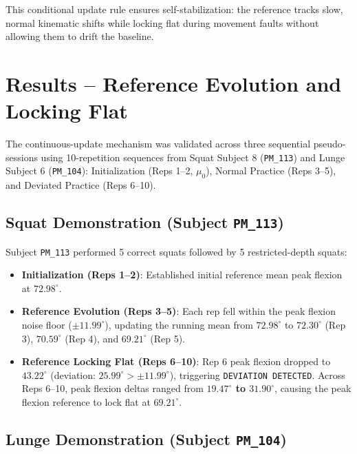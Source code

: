 This conditional update rule ensures self-stabilization: the reference tracks slow, normal kinematic shifts while locking flat during movement faults without allowing them to drift the baseline.



\section{Results -- Reference Evolution and Locking Flat}
\label{sec:11-3-results-reference-evolution-and-locking-flat}


The continuous-update mechanism was validated across three sequential pseudo-sessions using 10-repetition sequences from Squat Subject 8 (\texttt{PM\_113}) and Lunge Subject 6 (\texttt{PM\_104}): Initialization (Reps 1–2, $\mu_0$), Normal Practice (Reps 3–5), and Deviated Practice (Reps 6–10).

\subsection{Squat Demonstration (Subject \texttt{PM\_113})}
\label{sec:11-3-1-squat-demonstration-subject-texttt-pm-113}

Subject \texttt{PM\_113} performed 5 correct squats followed by 5 restricted-depth squats:
\begin{itemize}
  \item \textbf{Initialization (Reps 1–2)}: Established initial reference mean peak flexion at \textbf{$72.98^\circ$}.
  \item \textbf{Reference Evolution (Reps 3–5)}: Each rep fell within the peak flexion noise floor ($\pm 11.99^\circ$), updating the running mean from $72.98^\circ$ to \textbf{$72.30^\circ$} (Rep 3), \textbf{$70.59^\circ$} (Rep 4), and \textbf{$69.21^\circ$} (Rep 5).
  \item \textbf{Reference Locking Flat (Reps 6–10)}: Rep 6 peak flexion dropped to $43.22^\circ$ (deviation: \textbf{$25.99^\circ > \pm 11.99^\circ$}), triggering \texttt{DEVIATION DETECTED}. Across Reps 6–10, peak flexion deltas ranged from \textbf{$19.47^\circ$ to $31.90^\circ$}, causing the peak flexion reference to lock flat at \textbf{$69.21^\circ$}.
\end{itemize}

\subsection{Lunge Demonstration (Subject \texttt{PM\_104})}
\label{sec:11-3-2-lunge-demonstration-subject-texttt-pm-104}


